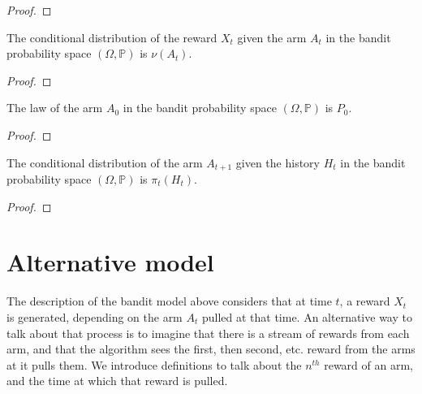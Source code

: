 \begin{proof}

\end{proof}


\begin{lemma}\label{lem:condDistrib_reward}
  \leanok
The conditional distribution of the reward $X_t$ given the arm $A_t$ in the bandit probability space $(\Omega, \mathbb{P})$ is $\nu(A_t)$.
\end{lemma}

\begin{proof}

\end{proof}


\begin{lemma}\label{lem:law_arm_zero}
  \leanok
The law of the arm $A_0$ in the bandit probability space $(\Omega, \mathbb{P})$ is $P_0$.
\end{lemma}

\begin{proof}

\end{proof}


\begin{lemma}\label{lem:condDistrib_arm}
  \leanok
The conditional distribution of the arm $A_{t+1}$ given the history $H_t$ in the bandit probability space $(\Omega, \mathbb{P})$ is $\pi_t(H_t)$.
\end{lemma}

\begin{proof}

\end{proof}



\section{Alternative model}\label{sec:alt_model}

The description of the bandit model above considers that at time $t$, a reward $X_t$ is generated, depending on the arm $A_t$ pulled at that time.
An alternative way to talk about that process is to imagine that there is a stream of rewards from each arm, and that the algorithm sees the first, then second, etc. reward from the arms at it pulls them.
We introduce definitions to talk about the $n^{th}$ reward of an arm, and the time at which that reward is pulled.

